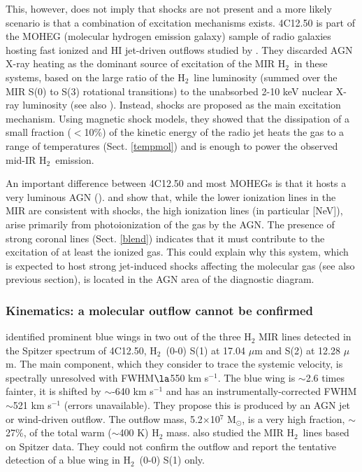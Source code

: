 \documentclass{aa}
\newcommand{\hmol}{H$_2$~}
\begin{document}
This, however, does not imply that  shocks are not present and a more likely scenario is that a combination of excitation mechanisms exists.   4C12.50 is part of the MOHEG (molecular hydrogen emission
galaxy) sample of radio galaxies hosting fast ionized and HI jet-driven outflows studied by \cite{Guillard2012}. 
 They  discarded AGN X-ray heating as the dominant source of excitation of the MIR \hmol in these systems,  based on the large ratio of the \hmol line luminosity (summed over the MIR S(0) to S(3) rotational transitions) to the unabsorbed 2-10 keV nuclear X-ray luminosity (see also \citealt{Ogle2010}).  Instead, shocks are proposed as the main    excitation mechanism. Using  magnetic shock models, they showed   that the dissipation of a small fraction ($<$10\%)  of the kinetic energy of the radio jet   heats the gas to a range of temperatures (Sect. \ref{tempmol}) and  is enough to  power the observed  mid-IR \hmol emission. 

An important difference between 4C12.50 and most MOHEGs is that it hosts a very luminous AGN (\citealt{Ogle2010}). \cite{Spoon2009b} and \cite{Guillard2012}  show that, while the lower ionization lines in the MIR are consistent with shocks, the high ionization lines (in particular [NeV]), arise primarily from photoionization of the gas by the AGN.  The presence of strong coronal lines (Sect. \ref{blend}) indicates that it must  contribute to the excitation of at least the ionized gas. This could explain why this system, which is expected to host strong jet-induced shocks affecting the molecular gas (see also previous section), is located in the AGN area of the diagnostic diagram.

\subsubsection{Kinematics: a  molecular outflow cannot be confirmed}
\label{kinmol}



 \cite{Dasyra2011} identified prominent blue wings in two out of the three H$_2$ MIR lines detected in the Spitzer spectrum of 4C12.50, \hmol(0-0) S(1) at 17.04 $\mu$m and S(2) at 12.28 $\mu$m. The main component, which they consider to trace the systemic velocity, is spectrally unresolved with FWHM$\la$550 km s$^{-1}$. The blue wing is $\sim$2.6 times fainter, it is shifted by  $\sim$-640 km s$^{-1}$ and has an instrumentally-corrected FWHM$\sim$521 km s$^{-1}$ (errors unavailable).  They propose this is produced by an AGN jet or wind-driven outflow. The  outflow  mass, 5.2$\times$10$^7$ M$_{\odot}$,  is a very high fraction, $\sim$27\%, of the total warm ($\sim$400 K) H$_2$  mass. \cite{Guillard2012} also  studied the MIR \hmol lines based on Spitzer data. They could not confirm the outflow and   report the tentative detection of a blue wing in \hmol(0-0) S(1) only.  
\end{document}

